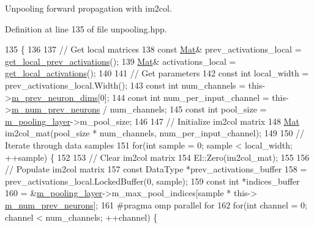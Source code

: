 Unpooling forward propagation with im2col. 



Definition at line 135 of file unpooling.\+hpp.


\begin{DoxyCode}
135                            \{
136 
137     \textcolor{comment}{// Get local matrices}
138     \textcolor{keyword}{const} \hyperlink{base_8hpp_a68f11fdc31b62516cb310831bbe54d73}{Mat}& prev\_activations\_local = \hyperlink{classlbann_1_1Layer_a35397843bb0c84030000c7d872229acb}{get\_local\_prev\_activations}();
139     \hyperlink{base_8hpp_a68f11fdc31b62516cb310831bbe54d73}{Mat}& activations\_local = \hyperlink{classlbann_1_1Layer_a4248f27acebf72b7b7b3ee39c8bcb62a}{get\_local\_activations}();
140 
141     \textcolor{comment}{// Get parameters}
142     \textcolor{keyword}{const} \textcolor{keywordtype}{int} local\_width = prev\_activations\_local.Width();
143     \textcolor{keyword}{const} \textcolor{keywordtype}{int} num\_channels = this->\hyperlink{classlbann_1_1Layer_ae204d1a2a79606eaa117273857ff62a3}{m\_prev\_neuron\_dims}[0];
144     \textcolor{keyword}{const} \textcolor{keywordtype}{int} num\_per\_input\_channel = this->\hyperlink{classlbann_1_1Layer_ac7b30f4e28d58204bfcbb76886f9136d}{m\_num\_prev\_neurons} / num\_channels;
145     \textcolor{keyword}{const} \textcolor{keywordtype}{int} pool\_size = \hyperlink{classlbann_1_1unpooling__layer_ab15a8b0680685f80c7d995e617e97a9a}{m\_pooling\_layer}->m\_pool\_size;
146 
147     \textcolor{comment}{// Initialize im2col matrix}
148     \hyperlink{base_8hpp_a68f11fdc31b62516cb310831bbe54d73}{Mat} im2col\_mat(pool\_size * num\_channels, num\_per\_input\_channel);
149 
150     \textcolor{comment}{// Iterate through data samples}
151     \textcolor{keywordflow}{for}(\textcolor{keywordtype}{int} sample = 0; sample < local\_width; ++sample) \{
152 
153       \textcolor{comment}{// Clear im2col matrix}
154       El::Zero(im2col\_mat);
155 
156       \textcolor{comment}{// Populate im2col matrix}
157       \textcolor{keyword}{const} DataType *prev\_activations\_buffer
158         = prev\_activations\_local.LockedBuffer(0, sample);
159       \textcolor{keyword}{const} \textcolor{keywordtype}{int} *indices\_buffer
160         = &\hyperlink{classlbann_1_1unpooling__layer_ab15a8b0680685f80c7d995e617e97a9a}{m\_pooling\_layer}->m\_max\_pool\_indices[sample * this->
      \hyperlink{classlbann_1_1Layer_ac7b30f4e28d58204bfcbb76886f9136d}{m\_num\_prev\_neurons}];
161 \textcolor{preprocessor}{      #pragma omp parallel for}
162       \textcolor{keywordflow}{for}(\textcolor{keywordtype}{int} channel = 0; channel < num\_channels; ++channel) \{

\end{DoxyCode}
